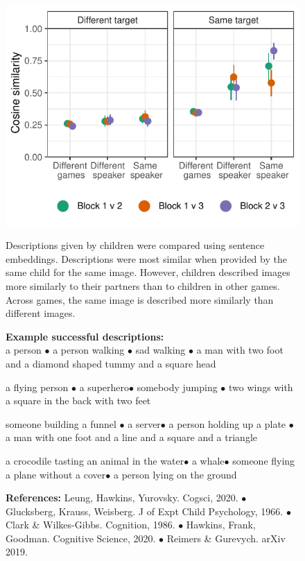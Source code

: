 \documentclass[11pt,a4paper]{article}
\begin{document}
\begin{figure}
\begin{minipage}{.5\textwidth}
		\end{minipage}
		~~~
		\begin{minipage}{.5\textwidth}	
		{\includegraphics[width=\textwidth]{sims.pdf}} 
		\begin{small}
		Descriptions given by children were compared using sentence embeddings. Descriptions were most similar when provided by the same child for the same image. However, children described images more similarly to their partners than to children in other games.  Across games, the same image is described more similarly than different images.
		\end{small}
		
		\bigskip
		\begin{small}
\textbf{\centering Example successful descriptions:\\}
		a person $\bullet$ a person walking $\bullet$ sad walking $\bullet$ a man with two foot and a diamond shaped tummy and a square head
		
		a flying person $\bullet$
		a superhero$\bullet$
		somebody jumping $\bullet$ two wings with a square in the back with two feet
		
		someone building a funnel $\bullet$
		a server$\bullet$
		a person holding up a plate $\bullet$ a man with one foot and a line and a square and a triangle
		
		
		a crocodile tasting an animal in the water$\bullet$
		a whale$\bullet$
		someone flying a plane without a cover$\bullet$
		a person lying on the ground
		
		\end{small}
		\end{minipage}
	\end{figure}



\begin{figure}
	\begin{small} \textbf{References:}
Leung, Hawkins, Yurovsky. Cogsci, 2020. $\bullet$ Glucksberg, Krauss, Weisberg. J of Expt Child Psychology, 1966. $\bullet$ Clark \& Wilkes-Gibbs. Cognition, 1986. $\bullet$ Hawkins, Frank, Goodman. Cognitive Science, 2020. $\bullet$ Reimers \& Gurevych. arXiv 2019.
\end{small}
\end{figure}
\end{document}
